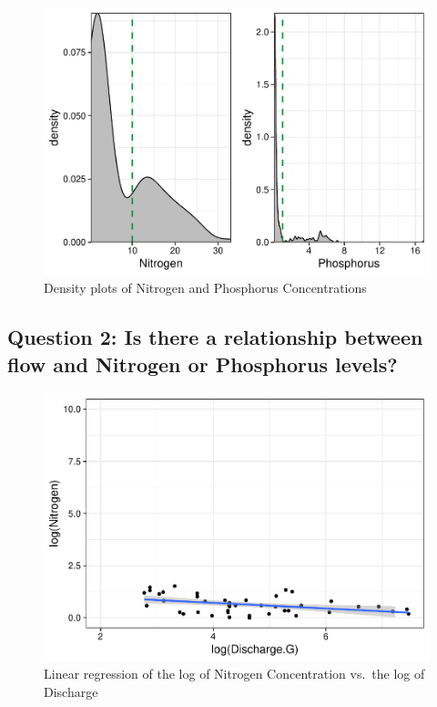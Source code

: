 \documentclass[12pt,]{article}
\begin{document}
\newpage

\begin{figure}
\centering
\includegraphics{Landman_ENV872_Project_files/figure-latex/Data Analysis Figure 6-1.pdf}
\caption{Density plots of Nitrogen and Phosphorus Concentrations}
\end{figure}

\newpage

\hypertarget{question-2-is-there-a-relationship-between-flow-and-nitrogen-or-phosphorus-levels}{%
\subsection{Question 2: Is there a relationship between flow and
Nitrogen or Phosphorus
levels?}\label{question-2-is-there-a-relationship-between-flow-and-nitrogen-or-phosphorus-levels}}

\begin{figure}
\centering
\includegraphics{Landman_ENV872_Project_files/figure-latex/Data Analysis Figure 7-1.pdf}
\caption{Linear regression of the log of Nitrogen Concentration vs.~the
log of Discharge}
\end{figure}
\end{document}
